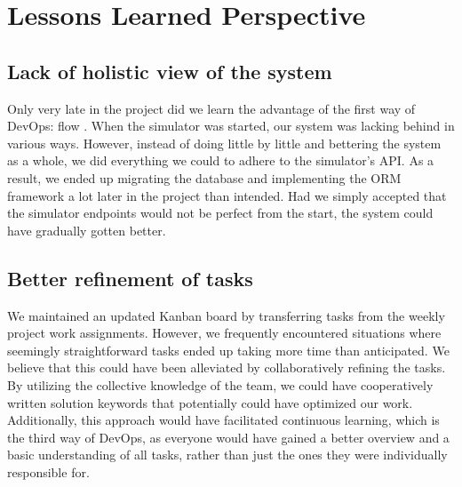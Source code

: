 \section{Lessons Learned Perspective}






\subsection{Lack of holistic view of the system}
Only very late in the project did we learn the advantage of the first way of DevOps: flow \cite{kim2021devops}. When the simulator was started, our system was lacking behind in various ways. However, instead of doing little by little and bettering the system as a whole, we did everything we could to adhere to the simulator's API. As a result, we ended up migrating the database and implementing the ORM framework a lot later in the project than intended. Had we simply accepted that the simulator endpoints would not be perfect from the start, the system could have gradually gotten better.

\subsection{Better refinement of tasks}
We maintained an updated Kanban board by transferring tasks from the weekly project work assignments. However, we frequently encountered situations where seemingly straightforward tasks ended up taking more time than anticipated. We believe that this could have been alleviated by collaboratively refining the tasks. By utilizing the collective knowledge of the team, we could have cooperatively written solution keywords that potentially could have optimized our work. Additionally, this approach would have facilitated continuous learning, which is the third way of DevOps\cite{kim2021devops}, as everyone would have gained a better overview and a basic understanding of all tasks, rather than just the ones they were individually responsible for. 

